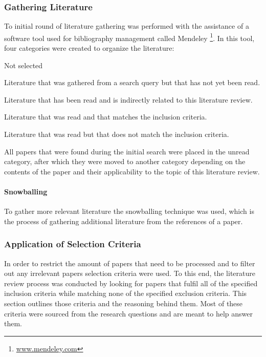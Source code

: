 		\subsubsection{Gathering Literature}
			To initial round of literature gathering was performed with the assistance of a software tool used for bibliography management called Mendeley \footnote{\url{www.mendeley.com}}.
			In this tool, four categories were created to organize the literature:
			\begin{aligneddescription}{Not selected}
				\item[Unread]       Literature that was gathered from a search query but that has not yet been read.
				\item[Related]      Literature that has been read and is indirectly related to this literature review.
				\item[Selected]     Literature that was read and that matches the inclusion criteria.
				\item[Not selected] Literature that was read but that does not match the inclusion criteria.
			\end{aligneddescription}
			All papers that were found during the initial search were placed in the unread category, after which they were moved to another category depending on the contents of the paper and their applicability to the topic of this literature review.

			\paragraph{Snowballing}
				To gather more relevant literature the snowballing technique was used, which is the process of gathering additional literature from the references of a paper.

		\subsubsection{Application of Selection Criteria}
			In order to restrict the amount of papers that need to be processed and to filter out any irrelevant papers selection criteria were used.
			To this end, the literature review process was conducted by looking for papers that fulfil all of the specified inclusion criteria while matching none of the specified exclusion criteria.
			This section outlines those criteria and the reasoning behind them.
			Most of these criteria were sourced from the research questions and are meant to help answer them.
			
